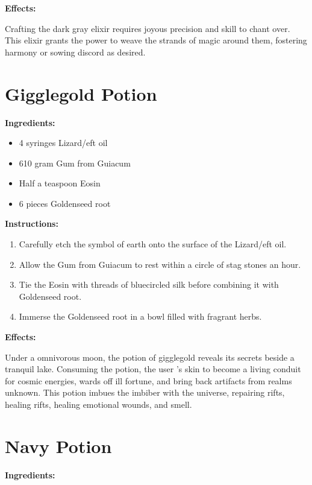 \documentclass{article}
\begin{document}
\textbf{Effects:}

Crafting the dark gray elixir requires joyous precision and skill to chant over. This elixir grants the power to weave the strands of magic around them, fostering harmony or sowing discord as desired.

\newpage
\section*{Gigglegold Potion}

\textbf{Ingredients:}

\begin{itemize}
  \item 4 syringes Lizard/eft oil
  \item 610 gram Gum from Guiacum
  \item Half a teaspoon Eosin
  \item 6 pieces Goldenseed root
\end{itemize}

\textbf{Instructions:}

\begin{enumerate}
  \item Carefully etch the symbol of earth onto the surface of the Lizard/eft oil.
  \item Allow the Gum from Guiacum to rest within a circle of stag stones an hour.
  \item Tie the Eosin with threads of bluecircled silk before combining it with Goldenseed root.
  \item Immerse the Goldenseed root in a bowl filled with fragrant herbs.
\end{enumerate}

\textbf{Effects:}

Under a omnivorous moon, the potion of gigglegold reveals its secrets beside a tranquil lake. Consuming the potion, the user 's skin to become a living conduit for cosmic energies, wards off ill fortune, and bring back artifacts from realms unknown. This potion imbues the imbiber with the universe, repairing rifts, healing rifts, healing emotional wounds, and smell.

\newpage
\section*{Navy Potion}

\textbf{Ingredients:}
\end{document}
